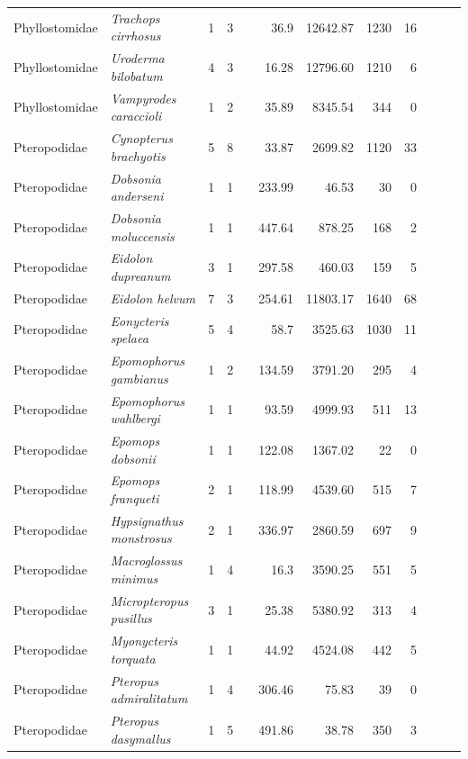 \begin{landscape}
\begin{longtable}{@{}llrrrrrrrrrl@{}}
  Phyllostomidae & \emph{Trachops cirrhosus} & 1 & 3 &  & 36.9 & 12642.87 & 1230 & 16 &  &  &  \\ 
  Phyllostomidae & \emph{Uroderma bilobatum} & 4 & 3 &  & 16.28 & 12796.60 & 1210 & 6 &  &  &  \\ 
  Phyllostomidae & \emph{Vampyrodes caraccioli} & 1 & 2 &  & 35.89 & 8345.54 & 344 & 0 &  &  &  \\ 
  Pteropodidae & \emph{Cynopterus brachyotis} & 5 & 8 &  & 33.87 & 2699.82 & 1120 & 33 &  &  &  \\ 
  Pteropodidae & \emph{Dobsonia anderseni} & 1 & 1 &  & 233.99 & 46.53 & 30 & 0 &  &  &  \\ 
  Pteropodidae & \emph{Dobsonia moluccensis} & 1 & 1 &  & 447.64 & 878.25 & 168 & 2 &  &  &  \\ 
  Pteropodidae & \emph{Eidolon dupreanum} & 3 & 1 &  & 297.58 & 460.03 & 159 & 5 &  &  &  \\ 
  Pteropodidae & \emph{Eidolon helvum} & 7 & 3 &  & 254.61 & 11803.17 & 1640 & 68 &  &  &  \\ 
  Pteropodidae & \emph{Eonycteris spelaea} & 5 & 4 &  & 58.7 & 3525.63 & 1030 & 11 &  &  &  \\ 
  Pteropodidae & \emph{Epomophorus gambianus} & 1 & 2 &  & 134.59 & 3791.20 & 295 & 4 &  &  &  \\ 
  Pteropodidae & \emph{Epomophorus wahlbergi} & 1 & 1 &  & 93.59 & 4999.93 & 511 & 13 &  &  &  \\ 
  Pteropodidae & \emph{Epomops dobsonii} & 1 & 1 &  & 122.08 & 1367.02 & 22 & 0 &  &  &  \\ 
  Pteropodidae & \emph{Epomops franqueti} & 2 & 1 &  & 118.99 & 4539.60 & 515 & 7 &  &  &  \\ 
  Pteropodidae & \emph{Hypsignathus monstrosus} & 2 & 1 &  & 336.97 & 2860.59 & 697 & 9 &  &  &  \\ 
  Pteropodidae & \emph{Macroglossus minimus} & 1 & 4 &  & 16.3 & 3590.25 & 551 & 5 &  &  &  \\ 
  Pteropodidae & \emph{Micropteropus pusillus} & 3 & 1 &  & 25.38 & 5380.92 & 313 & 4 &  &  &  \\ 
  Pteropodidae & \emph{Myonycteris torquata} & 1 & 1 &  & 44.92 & 4524.08 & 442 & 5 &  &  &  \\ 
  Pteropodidae & \emph{Pteropus admiralitatum} & 1 & 4 &  & 306.46 & 75.83 & 39 & 0 &  &  &  \\ 
  Pteropodidae & \emph{Pteropus dasymallus} & 1 & 5 &  & 491.86 & 38.78 & 350 & 3 &  &  &  \\ 

\end{longtable}
\end{landscape}
